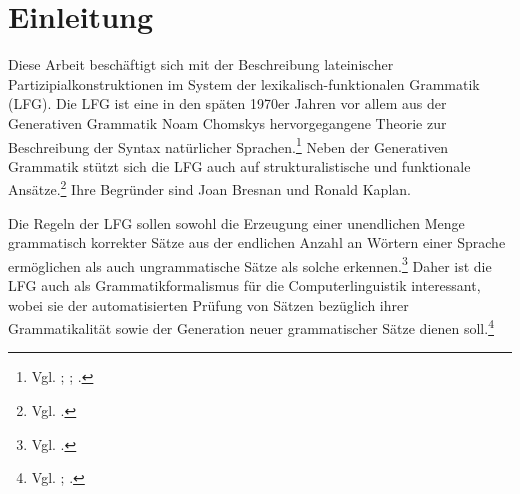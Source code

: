 \documentclass[12pt,a4paper]{article}
\begin{document}

\begingroup
\flushbottom
\begin{spacing}{1.25}
\tableofcontents
\end{spacing}
\thispagestyle{empty}
\pagebreak
\endgroup
\setcounter{page}{1}

\nocite{Menge}
\nocite{LHS}
\nocite{KSt}
\nocite{Rohrer}
\nocite{Skript}
\nocite{Dal}
\nocite{Falk}
\nocite{Bresnan}
\nocite{Snijders}
\nocite{DAZ}



\section{Einleitung}
Diese Arbeit beschäftigt sich mit der Beschreibung lateinischer Partizipialkonstruktionen im System der lexikalisch-funktionalen Grammatik (LFG). Die LFG ist eine in den späten 1970er Jahren vor allem aus der Generativen Grammatik Noam Chomskys hervorgegangene Theorie zur Beschreibung der Syntax natürlicher Sprachen.\footnote{Vgl. \cite[4]{Skript}; \cite[1]{Dal}; \cite[3]{Bresnan}.} Neben der Generativen Grammatik stützt sich die LFG auch auf strukturalistische und funktionale Ansätze.\footnote{Vgl. \cite[3]{Bresnan}.} Ihre Begründer sind Joan Bresnan und Ronald Kaplan.

Die Regeln der LFG sollen sowohl die Erzeugung einer unendlichen Menge grammatisch korrekter Sätze aus der endlichen Anzahl an Wörtern einer Sprache ermöglichen als auch ungrammatische Sätze als solche erkennen.\footnote{Vgl. \cite[18]{Skript}.} Daher ist die LFG auch als Grammatikformalismus für die Computerlinguistik interessant, wobei sie der automatisierten Prüfung von Sätzen bezüglich ihrer Grammatikalität sowie der Generation neuer grammatischer Sätze dienen soll.\footnote{Vgl. \cite[18]{Skript}; \cite[S. vii (preface)]{Bresnan}.}
 
\end{document}
